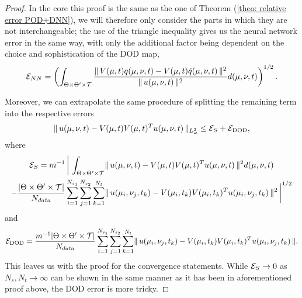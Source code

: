 \begin{proof}
    
    In the core this proof is the same as the one of Theorem (\ref{theo: relative error POD+DNN}), we will therefore only consider the parts in which they are not interchangeable; the use of the triangle inequality gives us the neural network error in the same way, with only the additional factor being dependent on the choice and sophistication of the DOD map, 
    \begin{equation}
        \mathcal{E}_{NN} = \left( \int_{\Theta \times \Theta' \times \mathcal{T}} \frac{\lVert \, V(\mu, t) q (\mu, \nu, t) - V(\mu, t) \hat{q}(\mu, \nu, t) \, \rVert^2}{\lVert \, u(\mu, \nu, t) \, \rVert^2} d(\mu, \nu, t) \right)^{1/2}.
    \end{equation}
    
    Moreover, we can extrapolate the same procedure of splitting the remaining term into the respective errors
    \begin{equation}
        \lVert \, u(\mu, \nu, t) - V(\mu, t) V(\mu, t)^T u(\mu, \nu, t) \, \rVert_{L^2_\omega} \leq \mathcal{E}_S + \mathcal{E}_{\text{DOD}},
    \end{equation}
    where
    \begin{multline*}
        \mathcal{E}_S = m^{-1} \, \bigg\vert \, \int_{\Theta \times \Theta' \times \mathcal{T}} \lVert \, u(\mu, \nu, t) - V(\mu, t) V(\mu, t)^T u(\mu, \nu, t) \, \rVert^2 d(\mu, \nu, t) \\
        - \frac{\vert \Theta \times \Theta' \times \mathcal{T} \vert}{N_{data}} \sum_{i = 1}^{N_{s_1}} \sum_{j = 1}^{N_{s_2}} \sum_{k = 1}^{N_t} \lVert \, u(\mu_i, \nu_j, t_k) - V(\mu_i, t_k) V(\mu_i, t_k)^T u(\mu_i, \nu_j, t_k) \, \rVert^2 \, \bigg\vert^{1/2}
    \end{multline*}
    and
    \begin{equation*}
        \mathcal{E}_{\text{DOD}} = \frac{m^{-1} \vert \Theta \times \Theta' \times \mathcal{T} \vert}{N_{data}} \sum_{i = 1}^{N_{s_1}} \sum_{j = 1}^{N_{s_2}} \sum_{k = 1}^{N_t} \lVert \, u(\mu_i, \nu_j, t_k) - V(\mu_i, t_k) V(\mu_i, t_k)^T u(\mu_i, \nu_j, t_k) \, \rVert.
    \end{equation*}
    This leaves us with the proof for the convergence statements. While $\mathcal{E}_S \to 0$ as $N_s, N_t \to \infty$ can be shown in the same manner as it has been in aforementioned proof above, the DOD error is more tricky. 
    

\end{proof}
